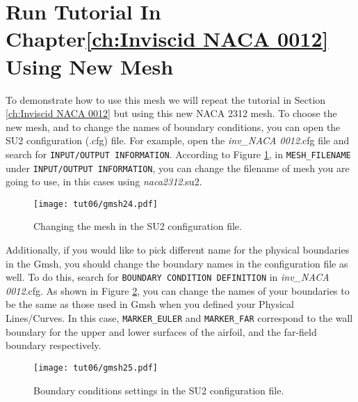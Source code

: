 \section{Run Tutorial In Chapter\ref{ch:Inviscid NACA 0012} Using New Mesh}
To demonstrate how to use this mesh we will repeat the tutorial in Section \ref{ch:Inviscid NACA 0012} but using this new NACA 2312 mesh. To choose the new mesh, and to change the names of boundary conditions, you can open the SU2 configuration (.cfg) file. For example, open the \textit{inv\_NACA 0012}.cfg file and search for \texttt{INPUT/OUTPUT INFORMATION}. According to Figure \ref{fig6:gmsh24}, in \texttt{MESH\_FILENAME} under \texttt{INPUT/OUTPUT INFORMATION}, you can change the filename of mesh you are going to use, in this cases using \textit{naca2312}.su2.
\begin{figure}[htbp]
    \centering
    \texttt{[image: tut06/gmsh24.pdf]}
    \caption{Changing the mesh in the SU2 configuration file.}
    \label{fig6:gmsh24}
\end{figure}
Additionally, if you would like to pick different name for the physical boundaries in the Gmsh, you should change the boundary names in the configuration file as well. To do this, search for \texttt{BOUNDARY CONDITION DEFINITION} in \textit{inv\_NACA 0012}.cfg. As shown in Figure \ref{fig6:gmsh25}, you can change the names of your boundaries to be the same as those used in Gmsh when you defined your Physical Lines/Curves. In this case, \texttt{MARKER\_EULER} and \texttt{MARKER\_FAR} correspond to the wall boundary for the upper and lower surfaces of the airfoil, and the far-field boundary respectively.
\begin{figure}[htbp]
    \centering
    \texttt{[image: tut06/gmsh25.pdf]}
    \caption{Boundary conditions settings in the SU2 configuration file.}
    \label{fig6:gmsh25}
\end{figure}
